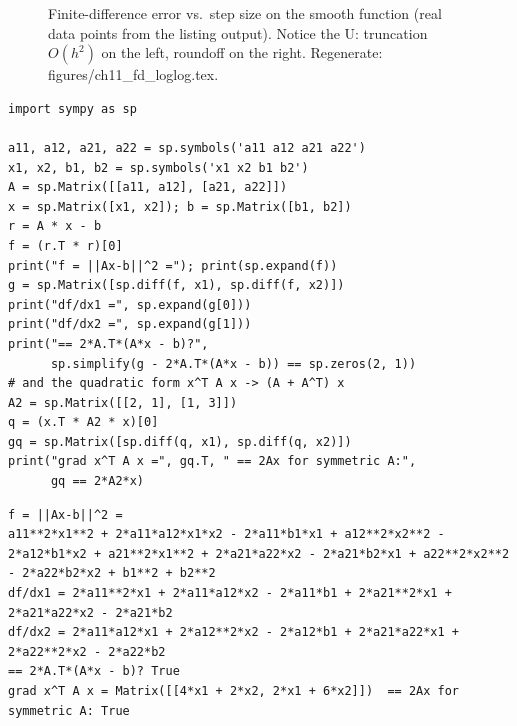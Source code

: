 \begin{figure}[htbp]
\centering

\caption{Finite-difference error vs.\ step size on the smooth function
(real data points from the listing output). Notice the U: truncation
$O(h^{2})$ on the left, roundoff on the right. Regenerate:
\ttfamily figures/ch11\_fd\_loglog.tex.}
\label{fig:fdlog}
\end{figure}

\begin{lstlisting}[caption={\ttfamily code/ch11\_sympy\_check.py ---
symbolic cross-check: SymPy confirms $\nabla\|Ax-b\|^2=2A^{T}(Ax-b)$
and the quadratic-form rule.}]
import sympy as sp

a11, a12, a21, a22 = sp.symbols('a11 a12 a21 a22')
x1, x2, b1, b2 = sp.symbols('x1 x2 b1 b2')
A = sp.Matrix([[a11, a12], [a21, a22]])
x = sp.Matrix([x1, x2]); b = sp.Matrix([b1, b2])
r = A * x - b
f = (r.T * r)[0]
print("f = ||Ax-b||^2 ="); print(sp.expand(f))
g = sp.Matrix([sp.diff(f, x1), sp.diff(f, x2)])
print("df/dx1 =", sp.expand(g[0]))
print("df/dx2 =", sp.expand(g[1]))
print("== 2*A.T*(A*x - b)?",
      sp.simplify(g - 2*A.T*(A*x - b)) == sp.zeros(2, 1))
# and the quadratic form x^T A x -> (A + A^T) x
A2 = sp.Matrix([[2, 1], [1, 3]])
q = (x.T * A2 * x)[0]
gq = sp.Matrix([sp.diff(q, x1), sp.diff(q, x2)])
print("grad x^T A x =", gq.T, " == 2Ax for symmetric A:",
      gq == 2*A2*x)
\end{lstlisting}

\begin{lstlisting}[caption={Output of the SymPy check --- the expanded
partial matches the matrix rule term for term, and the quadratic-form
identity verifies to \texttt{True}.}]
f = ||Ax-b||^2 =
a11**2*x1**2 + 2*a11*a12*x1*x2 - 2*a11*b1*x1 + a12**2*x2**2 - 2*a12*b1*x2 + a21**2*x1**2 + 2*a21*a22*x2 - 2*a21*b2*x1 + a22**2*x2**2 - 2*a22*b2*x2 + b1**2 + b2**2
df/dx1 = 2*a11**2*x1 + 2*a11*a12*x2 - 2*a11*b1 + 2*a21**2*x1 + 2*a21*a22*x2 - 2*a21*b2
df/dx2 = 2*a11*a12*x1 + 2*a12**2*x2 - 2*a12*b1 + 2*a21*a22*x1 + 2*a22**2*x2 - 2*a22*b2
== 2*A.T*(A*x - b)? True
grad x^T A x = Matrix([[4*x1 + 2*x2, 2*x1 + 6*x2]])  == 2Ax for symmetric A: True
\end{lstlisting}

